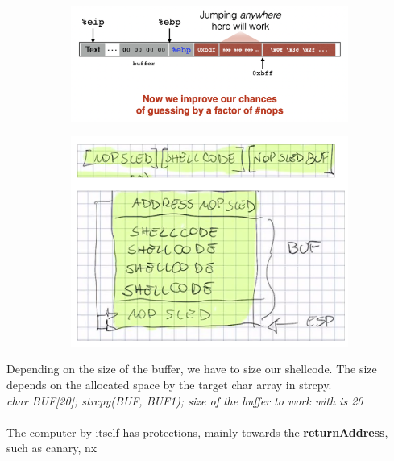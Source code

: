 \documentclass[11pt, oneside]{article}   	%
\begin{document}
\begin{figure}
\begin{subfigure}{0.4\linewidth}
\includegraphics[width=\linewidth]{nop}
\end{subfigure}
\hfill
\begin{subfigure}{0.4\linewidth}
\includegraphics[width=\linewidth]{nopsled}
\end{subfigure}
\end{figure}
Depending on the size of the buffer, we have to size our shellcode. The size depends on the allocated space by the target char array in strcpy.\\ \emph{char BUF[20]; strcpy(BUF, BUF1); size of the buffer to work with is 20}\\\\
The computer by itself has protections, mainly towards the \textbf{returnAddress}, such as canary, nx\\\\
\end{document}
